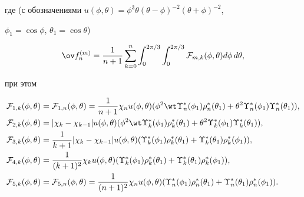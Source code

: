 где (с обозначениями $u(\phi, \theta)=\phi^3 \theta


(\theta-\phi)^{-2}(\theta+\phi)^{-2}$,


$\phi_1= \cos \phi$, $\theta_1=\cos \theta $)


$$


\ov f_n^{(m)}=


\frac{1}{n+1}\sum_{k=0}^n


\int_0^{{2\pi}/{3}} \int_0^{{2\pi}/{3}}


{\cal F}_{m,k}(\phi,\theta) d\phi\, d\theta,


$$


при этом


\begin{align*}


{\cal F}_{1,k}(\phi,\theta)&={\cal F}_{1,n}(\phi,\theta)=


\frac {1}{n+1}\chi_n u(\phi, \theta)


(\phi^2 \wt\Upsilon_n^* (\phi_1) \rho_n^*(\theta_1)+\theta^2


\Upsilon_n^* (\phi_1)\Upsilon_n^* (\theta_1)), \\


%


{\cal F}_{2,k}(\phi,\theta)&=


|\chi_k -\chi_{k-1}| u(\phi, \theta)


(\phi^2 \wt\Upsilon_k^* (\phi_1)\rho_k^*(\theta_1)+\theta^2


\Upsilon_k^* (\phi_1)\Upsilon_k^* (\theta_1)), \\


%


{\cal F}_{3,k}(\phi,\theta)&=


\frac{1}{k+1}|\chi_k -\chi_{k-1}| u(\phi, \theta)


(\Upsilon_k^* (\phi_1)\rho_k^*(\theta_1)


+\Upsilon_k^* (\theta_1)\rho_k^* (\phi_1)), \\


%


{\cal F}_{4,k}(\phi,\theta)&=


\frac{1}{(k+1)^2}\chi_k u(\phi, \theta)


(\Upsilon_k^* (\phi_1)\rho_k^*(\theta_1)+


\Upsilon_k^* (\theta_1)\rho_k^* (\phi_1)), \\


%


{\cal F}_{5,k}(\phi,\theta)&={\cal F}_{5,n}(\phi,\theta)


=\frac{1}{(n+1)^2}\chi_n u(\phi, \theta)


(\Upsilon_n^* (\phi_1)\rho_n^*(\theta_1)+


\Upsilon_n^* (\theta_1)\rho_n^* (\phi_1)).


\end{align*}





